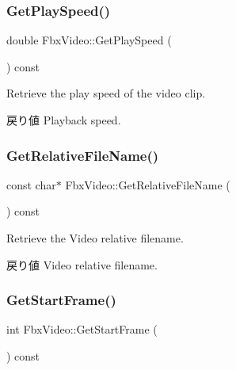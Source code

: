 \mbox{\label{class_fbx_video_a69311023497b0ace1ac4fd78318b178a}} 
\subsubsection{\texorpdfstring{Get\+Play\+Speed()}{GetPlaySpeed()}}
{\footnotesize\ttfamily double Fbx\+Video\+::\+Get\+Play\+Speed (\begin{DoxyParamCaption}{ }\end{DoxyParamCaption}) const}

Retrieve the play speed of the video clip. \begin{DoxyReturn}{戻り値}
Playback speed. 
\end{DoxyReturn}
\mbox{\label{class_fbx_video_a5c99c225a47e6aae4cd3028f2737babb}} 
\subsubsection{\texorpdfstring{Get\+Relative\+File\+Name()}{GetRelativeFileName()}}
{\footnotesize\ttfamily const char$\ast$ Fbx\+Video\+::\+Get\+Relative\+File\+Name (\begin{DoxyParamCaption}{ }\end{DoxyParamCaption}) const}

Retrieve the Video relative filename. \begin{DoxyReturn}{戻り値}
Video relative filename. 
\end{DoxyReturn}
\mbox{\label{class_fbx_video_ab634605d67edca645b11d575b04e42ff}} 
\subsubsection{\texorpdfstring{Get\+Start\+Frame()}{GetStartFrame()}}
{\footnotesize\ttfamily int Fbx\+Video\+::\+Get\+Start\+Frame (\begin{DoxyParamCaption}{ }\end{DoxyParamCaption}) const}

